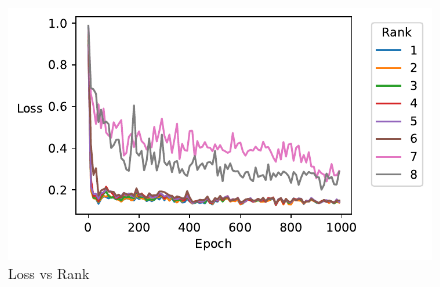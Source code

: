 \documentclass{article}
\theoremstyle{plain}
\theoremstyle{definition}
\theoremstyle{remark}
\begin{document}
\begin{figure}[ht]
    \centerline{\includegraphics{../figures/s5_high_rank_circuits_loss_vs_rank.pdf}}
    \centering
    \caption{Loss vs Rank}\label{fig:s5_high_rank_circuits_loss_vs_rank}
\end{figure}
\end{document}
